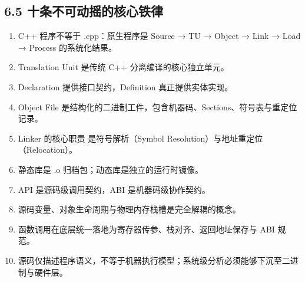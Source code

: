 \documentclass[11pt,a4paper]{article}
\begin{document}
\subsection{6.5 十条不可动摇的核心铁律}
\begin{enumerate}
	\item C++ 程序不等于 .cpp：原生程序是 Source → TU → Object → Link → Load → Process 的系统化结果。
	\item Translation Unit 是传统 C++ 分离编译的核心独立单元。
	\item Declaration 提供接口契约，Definition 真正提供实体实现。
	\item Object File 是结构化的二进制工件，包含机器码、Sections、符号表与重定位记录。
	\item Linker 的核心职责 是符号解析（Symbol Resolution）与地址重定位（Relocation）。
	\item 静态库是 .o 归档包；动态库是独立的运行时镜像。
	\item API 是源码级调用契约，ABI 是机器码级协作契约。
	\item 源码变量、对象生命周期与物理内存栈槽是完全解耦的概念。
	\item 函数调用在底层统一落地为寄存器传参、栈对齐、返回地址保存与 ABI 规范。
	\item 源码仅描述程序语义，不等于机器执行模型；系统级分析必须能够下沉至二进制与硬件层。
\end{enumerate}
\end{document}

